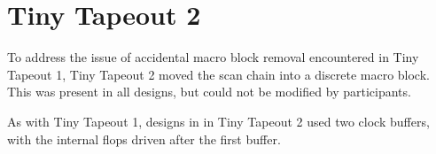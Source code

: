 \section{Tiny Tapeout 2}
\label{sec:tinytapeout2}

To address the issue of accidental macro block removal encountered in Tiny Tapeout 1, Tiny Tapeout 2 moved the scan chain into a discrete macro block. This was present in all designs, but could not be modified by participants.

As with Tiny Tapeout 1, designs in in Tiny Tapeout 2 used two clock buffers, with the internal flops driven after the first buffer.

